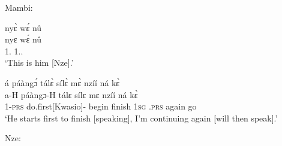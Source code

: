 \noindent Mambi:

\begin{exe}[(C234)]  
\exC\label{09}
  \glll     nyɛ̀ wɛ́ nû \\
           nyɛ wɛ́ nû \\
              1.{\SBJ}  {\ID} 1.{\DEM}.{\PROX} \\
    \trans `This is him [Nze].'
 
\exC\label{10} 
  \glll     á páàngɔ́ tálɛ̀ sílɛ̀ mɛ̀ nzíí ná kɛ̀ \\
            a-H páàngɔ-H tálɛ sílɛ mɛ nzíí ná kɛ̀\\
              1-\textsc{prs} do.first[Kwasio]-{\R} begin finish 1\textsc{sg} {\PROG}.\textsc{prs} again go \\ 
    \trans `He starts first to finish [speaking], I'm continuing again [will then speak].'
\end{exe}

\noindent Nze:

